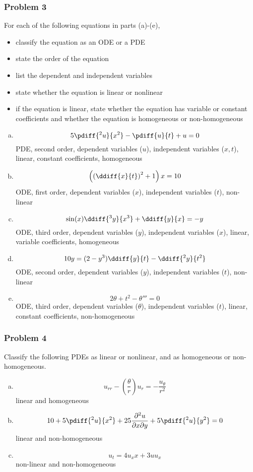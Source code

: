 \documentclass{math}
\begin{document}
\subsubsection*{Problem 3}
For each of the following equations in parts (a)-(e),
\begin{itemize}
  \item classify the equation as an ODE or a PDE
  \item state the order of the equation
  \item list the dependent and independent variables
  \item state whether the equation is linear or nonlinear
  \item if the equation is linear, state whether the equation has variable or
    constant coefficients and whether the equation is homogeneous or
    non-homogeneous
\end{itemize}
\begin{enumerate}[(a)]
  \item \[ 5\pdiff{^2u}{x^2}-\pdiff{u}{t}+u = 0 \]
    PDE, second order, dependent variables (\( u \)), independent variables
    (\( x, t \)), linear, constant coefficients, homogeneous
  \item \[ \left(\left(\ddiff{x}{t}\right)^2+1\right)x = 10 \]
    ODE, first order, dependent variables (\( x \)), independent variables
    (\( t \)), non-linear
  \item \[ \sin(x)\ddiff{^3y}{x^3}+\ddiff{y}{x} = -y \]
    ODE, third order, dependent variables (\( y \)), independent variables
    (\( x \)), linear, variable coefficients, homogeneous
  \item \[ 10y = (2-y^3)\ddiff{y}{t}-\ddiff{^2y}{t^2} \]
    ODE, second order, dependent variables (\( y \)), independent variables
    (\( t \)), non-linear
  \item \[ 2\theta+t^2-\theta''' = 0 \]
    ODE, third order, dependent variables (\( \theta \)), independent variables
    (\( t \)), linear, constant coefficients, non-homogeneous
\end{enumerate}

\subsubsection*{Problem 4}
Classify the following PDEs as linear or nonlinear, and as homogeneous or
non-homogeneous.
\begin{enumerate}[(a)]
  \item \[ u_{rr}-(\frac{\theta}{r})u_r = -\frac{u_{\theta}}{r^2} \]
  linear and homogeneous
  \item \[ 10+5\pdiff{^2u}{x^2}+25\frac{\partial^2u}{\partial x\partial y}+
    5\pdiff{^2u}{y^2} = 0 \]
    linear and non-homogeneous
  \item \[ u_t = 4u_xx+3uu_x \]
    non-linear and non-homogeneous
\end{enumerate}
\end{document}
